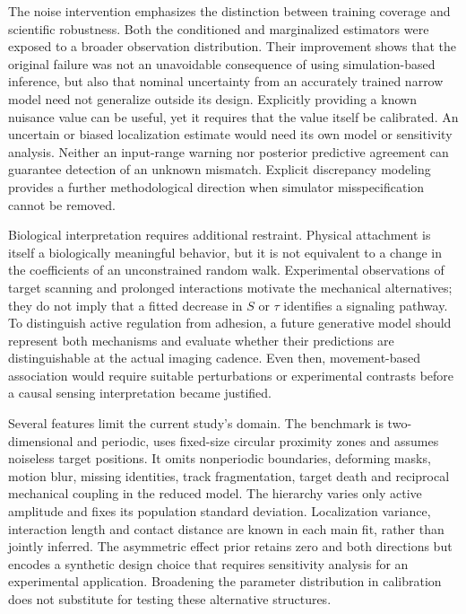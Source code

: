 \documentclass[12pt]{article}
\begin{document}
The noise intervention emphasizes the distinction between training coverage and scientific robustness. Both the conditioned and marginalized estimators were exposed to a broader observation distribution. Their improvement shows that the original failure was not an unavoidable consequence of using simulation-based inference, but also that nominal uncertainty from an accurately trained narrow model need not generalize outside its design. Explicitly providing a known nuisance value can be useful, yet it requires that the value itself be calibrated. An uncertain or biased localization estimate would need its own model or sensitivity analysis. Neither an input-range warning nor posterior predictive agreement can guarantee detection of an unknown mismatch. Explicit discrepancy modeling provides a further methodological direction when simulator misspecification cannot be removed\citep{ward2022}.

Biological interpretation requires additional restraint. Physical attachment is itself a biologically meaningful behavior, but it is not equivalent to a change in the coefficients of an unconstrained random walk. Experimental observations of target scanning and prolonged interactions motivate the mechanical alternatives\citep{olofsson2014}; they do not imply that a fitted decrease in $S$ or $\tau$ identifies a signaling pathway. To distinguish active regulation from adhesion, a future generative model should represent both mechanisms and evaluate whether their predictions are distinguishable at the actual imaging cadence. Even then, movement-based association would require suitable perturbations or experimental contrasts before a causal sensing interpretation became justified.

Several features limit the current study's domain. The benchmark is two-dimensional and periodic, uses fixed-size circular proximity zones and assumes noiseless target positions. It omits nonperiodic boundaries, deforming masks, motion blur, missing identities, track fragmentation, target death and reciprocal mechanical coupling in the reduced model. The hierarchy varies only active amplitude and fixes its population standard deviation. Localization variance, interaction length and contact distance are known in each main fit, rather than jointly inferred. The asymmetric effect prior retains zero and both directions but encodes a synthetic design choice that requires sensitivity analysis for an experimental application. Broadening the parameter distribution in calibration does not substitute for testing these alternative structures.
\end{document}
